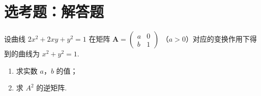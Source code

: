 \section{选考题：解答题}

\begin{problem}
设曲线 \(2x^{2} + 2xy + y^{2} = 1\) 在矩阵 \(\mathbf{A} = \begin{pmatrix} a & 0 \\ b & 1 \end{pmatrix}\) （\(a > 0\)）对应的变换作用下得到的曲线为 \(x^{2} + y^{2} = 1\).

\begin{enumerate}
\item 求实数 \(a\)，\(b\) 的值；
\item 求 \(A^{2}\) 的逆矩阵.
\end{enumerate}
\end{problem}

